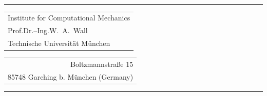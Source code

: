 \begin{titlepage}
%
\vspace{1cm}\\
%
\rule{\textwidth}{1pt}
%
\begin{tabular}[t]{l}
Institute for Computational Mechanics
\\
  Prof.\@ Dr.--Ing.\@ W.\ A.\ Wall
\\
Technische Universit\"at M\"unchen
\end{tabular}
\hfill
\begin{tabular}[t]{r}
\\
Boltzmannstra\ss e 15
\\
85748 Garching b. M\"unchen (Germany)\\
\end{tabular}
\rule{\textwidth}{1pt}


\end{titlepage}